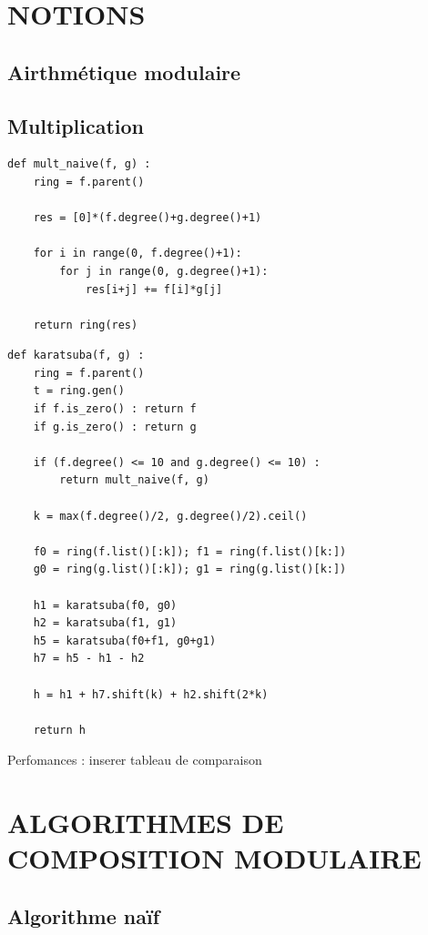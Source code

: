 \documentclass[a4paper]{article}
\begin{document}
\section{NOTIONS}

\subsection{Airthmétique modulaire}

\subsection{Multiplication}

\begin{lstlisting}[frame=leftline, title={multiplication naive}]
    def mult_naive(f, g) :
    ring = f.parent()
  
    res = [0]*(f.degree()+g.degree()+1) 
    
    for i in range(0, f.degree()+1):
        for j in range(0, g.degree()+1):
            res[i+j] += f[i]*g[j]

    return ring(res) 
\end{lstlisting}

\begin{lstlisting}[frame=leftline, title={karastuba}]
def karatsuba(f, g) :
    ring = f.parent()
    t = ring.gen()
    if f.is_zero() : return f
    if g.is_zero() : return g
    
    if (f.degree() <= 10 and g.degree() <= 10) : 
        return mult_naive(f, g)

    k = max(f.degree()/2, g.degree()/2).ceil()

    f0 = ring(f.list()[:k]); f1 = ring(f.list()[k:])
    g0 = ring(g.list()[:k]); g1 = ring(g.list()[k:])

    h1 = karatsuba(f0, g0)
    h2 = karatsuba(f1, g1)
    h5 = karatsuba(f0+f1, g0+g1)
    h7 = h5 - h1 - h2

    h = h1 + h7.shift(k) + h2.shift(2*k)

    return h
\end{lstlisting}

Perfomances : inserer tableau de comparaison  \cite{aecf}

\section{ALGORITHMES DE COMPOSITION MODULAIRE}
\subsection{Algorithme naïf}
\end{document}
